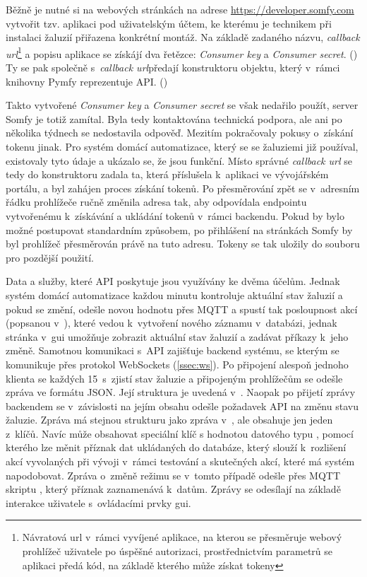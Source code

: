     Běžně je nutné si na webových stránkách na adrese \href{https://develeoper.somfy.com}{https://developer.som\-fy.com} vytvořit tzv. aplikaci pod uživatelským účtem, ke kterému je technikem při instalaci žaluzií přiřazena konkrétní montáž. Na základě zadaného názvu, \emph{callback \acrshort{url}}\footnote[1]{Návratová \acrshort{url} v~rámci vyvíjené aplikace, na kterou se přesměruje webový prohlížeč uživatele po úspěšné autorizaci, prostřednictvím parametrů se aplikaci předá kód, na základě kterého může získat tokeny} a popisu aplikace se získájí dva řetězce: \emph{Consumer key} a \emph{Consumer secret}. (\cite{somfy:api}) Ty se pak společně s~\emph{callback \acrshort{url}}\footnotemark[1] předají konstruktoru objektu, který v~rámci knihovny Pymfy reprezentuje API. (\cite{tetienne:pymfy})

    Takto vytvořené \emph{Consumer key} a \emph{Consumer secret} se však nedařilo použít, server Somfy je totiž zamítal. Byla tedy kontaktována technická podpora, ale ani po několika týdnech se nedostavila odpověď. Mezitím pokračovaly pokusy o~získání tokenu jinak. Pro systém domácí automatizace, který se se žaluziemi již používal, existovaly tyto údaje a ukázalo se, že jsou funkční. Místo správné \emph{callback \acrshort{url}} se tedy do konstruktoru zadala ta, která příslušela k~aplikaci ve vývojářském portálu, a byl zahájen proces získání tokenů. Po přesměrování zpět se v~adresním řádku prohlížeče ručně změnila adresa tak, aby odpovídala endpointu vytvořenému k~získávání a ukládání tokenů v~rámci backendu. Pokud by bylo možné postupovat standardním způsobem, po přihlášení na stránkách Somfy by byl prohlížeč přesměrován právě na tuto adresu. Tokeny se tak uložily do souboru  pro pozdější použití.

    Data a služby, které API poskytuje jsou využívány ke dvěma účelům. Jednak systém domácí automatizace každou minutu kontroluje aktuální stav žaluzií a pokud se změní, odešle novou hodnotu přes MQTT a spustí tak posloupnost akcí (popsanou v~), které vedou k~vytvoření nového záznamu v~databázi, jednak stránka  v~\acrshort{gui} umožňuje zobrazit aktuální stav žaluzií a zadávat příkazy k~jeho změně. Samotnou komunikaci s~API zajišťuje backend systému, se kterým se komunikuje přes protokol WebSockets (\cref{ssec:ws}). Po připojení alespoň jednoho klienta se každých 15~s~zjistí stav žaluzie a připojeným prohlížečům se odešle zpráva ve formátu JSON. Její struktura je uvedená v~. Naopak po přijetí zprávy backendem se v~závislosti na jejím obsahu odešle požadavek API na změnu stavu žaluzie. Zpráva má stejnou strukturu jako zpráva v~, ale obsahuje jen jeden z~klíčů. Navíc může obsahovat speciální klíč  s hodnotou datového typu , pomocí kterého lze měnit příznak  dat ukládaných do databáze, který slouží k~rozlišení akcí vyvolaných při vývoji v~rámci testování a skutečných akcí, které má systém napodobovat. Zpráva o~změně režimu se v~tomto případě odešle přes MQTT skriptu , který příznak zaznamenává k~datům. Zprávy se odesílají na základě interakce uživatele s~ovládacími prvky \acrshort{gui}.

